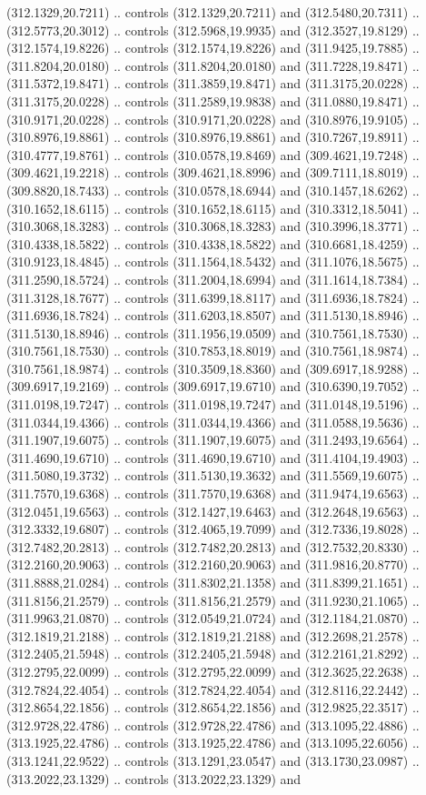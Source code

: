 (312.1329,20.7211) .. controls (312.1329,20.7211) and (312.5480,20.7311) .. (312.5773,20.3012) .. controls (312.5968,19.9935) and (312.3527,19.8129) .. (312.1574,19.8226) .. controls (312.1574,19.8226) and (311.9425,19.7885) .. (311.8204,20.0180) .. controls (311.8204,20.0180) and (311.7228,19.8471) .. (311.5372,19.8471) .. controls (311.3859,19.8471) and (311.3175,20.0228) .. (311.3175,20.0228) .. controls (311.2589,19.9838) and (311.0880,19.8471) .. (310.9171,20.0228) .. controls (310.9171,20.0228) and (310.8976,19.9105) .. (310.8976,19.8861) .. controls (310.8976,19.8861) and (310.7267,19.8911) .. (310.4777,19.8761) .. controls (310.0578,19.8469) and (309.4621,19.7248) .. (309.4621,19.2218) .. controls (309.4621,18.8996) and (309.7111,18.8019) .. (309.8820,18.7433) .. controls (310.0578,18.6944) and (310.1457,18.6262) .. (310.1652,18.6115) .. controls (310.1652,18.6115) and (310.3312,18.5041) .. (310.3068,18.3283) .. controls (310.3068,18.3283) and (310.3996,18.3771) .. (310.4338,18.5822) .. controls (310.4338,18.5822) and (310.6681,18.4259) .. (310.9123,18.4845) .. controls (311.1564,18.5432) and (311.1076,18.5675) .. (311.2590,18.5724) .. controls (311.2004,18.6994) and (311.1614,18.7384) .. (311.3128,18.7677) .. controls (311.6399,18.8117) and (311.6936,18.7824) .. (311.6936,18.7824) .. controls (311.6203,18.8507) and (311.5130,18.8946) .. (311.5130,18.8946) .. controls (311.1956,19.0509) and (310.7561,18.7530) .. (310.7561,18.7530) .. controls (310.7853,18.8019) and (310.7561,18.9874) .. (310.7561,18.9874) .. controls (310.3509,18.8360) and (309.6917,18.9288) .. (309.6917,19.2169) .. controls (309.6917,19.6710) and (310.6390,19.7052) .. (311.0198,19.7247) .. controls (311.0198,19.7247) and (311.0148,19.5196) .. (311.0344,19.4366) .. controls (311.0344,19.4366) and (311.0588,19.5636) .. (311.1907,19.6075) .. controls (311.1907,19.6075) and (311.2493,19.6564) .. (311.4690,19.6710) .. controls (311.4690,19.6710) and (311.4104,19.4903) .. (311.5080,19.3732) .. controls (311.5130,19.3632) and (311.5569,19.6075) .. (311.7570,19.6368) .. controls (311.7570,19.6368) and (311.9474,19.6563) .. (312.0451,19.6563) .. controls (312.1427,19.6463) and (312.2648,19.6563) .. (312.3332,19.6807) .. controls (312.4065,19.7099) and (312.7336,19.8028) .. (312.7482,20.2813) .. controls (312.7482,20.2813) and (312.7532,20.8330) .. (312.2160,20.9063) .. controls (312.2160,20.9063) and (311.9816,20.8770) .. (311.8888,21.0284) .. controls (311.8302,21.1358) and (311.8399,21.1651) .. (311.8156,21.2579) .. controls (311.8156,21.2579) and (311.9230,21.1065) .. (311.9963,21.0870) .. controls (312.0549,21.0724) and (312.1184,21.0870) .. (312.1819,21.2188) .. controls (312.1819,21.2188) and (312.2698,21.2578) .. (312.2405,21.5948) .. controls (312.2405,21.5948) and (312.2161,21.8292) .. (312.2795,22.0099) .. controls (312.2795,22.0099) and (312.3625,22.2638) .. (312.7824,22.4054) .. controls (312.7824,22.4054) and (312.8116,22.2442) .. (312.8654,22.1856) .. controls (312.8654,22.1856) and (312.9825,22.3517) .. (312.9728,22.4786) .. controls (312.9728,22.4786) and (313.1095,22.4886) .. (313.1925,22.4786) .. controls (313.1925,22.4786) and (313.1095,22.6056) .. (313.1241,22.9522) .. controls (313.1291,23.0547) and (313.1730,23.0987) .. (313.2022,23.1329) .. controls (313.2022,23.1329) and 